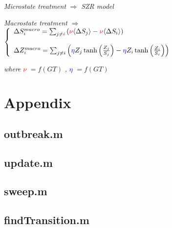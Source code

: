 \documentclass[11pt]{article} %
\begin{document}
\bigskip

\textit{Microstate treatment} $\Rightarrow$ \textit{SZR model} 

\bigskip

\textit{Macrostate treatment} $\Rightarrow$  $\left\{
	\begin{array}{l l}
		\Delta S_{i}^{macro} =  \sum_{j\neq i}{ \left( \textcolor{red}{\nu} \langle \Delta S_{j} \rangle - \textcolor{red}{\nu}  \langle \Delta S_{i} \rangle \right) }	
    \\
    \\
    		\Delta Z_{i}^{macro} = \sum_{j\neq i}{\left( \textcolor{blue}{\eta} Z_{j}\tanh \left( \frac{Z_{j}}{S_{j}}\right) -\textcolor{blue}{\eta} Z_{i}\tanh \left( \frac{Z_{i}}{S_{i}}\right) \right)}

	\end{array} \right.$

\bigskip

\textit{where} \textcolor{red}{$\nu$} $= f(GT)$ \textit{,} \textcolor{blue}{$\eta$} $= f(GT)$  
\bigskip




\newpage




\newpage

\section{Appendix}
\bigskip
\subsection{outbreak.m}
\label{sec:outbreak}

\bigskip
\bigskip
\bigskip

\subsection{update.m}
\label{sec:update}

\bigskip
\bigskip
\bigskip

\subsection{sweep.m}
\label{sec:sweep}

\bigskip
\bigskip
\bigskip

\subsection{findTransition.m}
\label{sec:findtrans}

\end{document}
